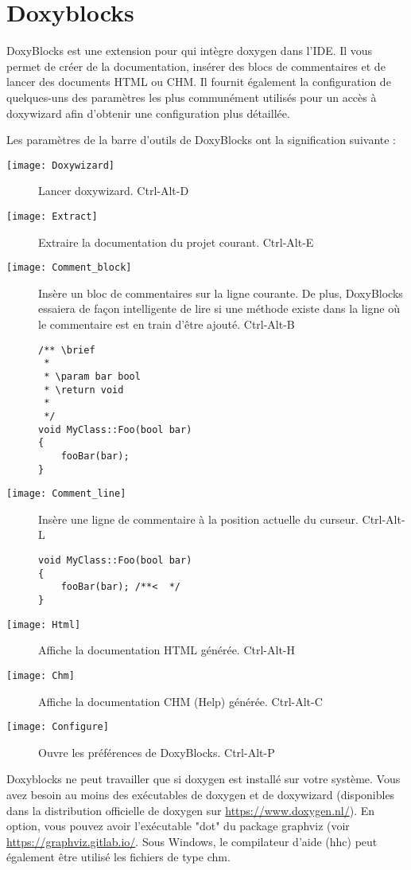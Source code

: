 ﻿\section{Doxyblocks}\label{sec:doxyblocks}

DoxyBlocks est une extension pour \codeblocks qui intègre doxygen dans l'IDE. Il vous permet de créer de la documentation, insérer des blocs de commentaires et de lancer des documents HTML ou CHM. Il fournit également la configuration de quelques-uns des paramètres les plus communément utilisés pour un accès à doxywizard afin d'obtenir une configuration plus détaillée.

Les paramètres de la barre d'outils de DoxyBlocks ont la signification suivante :

\begin{description}
\item[\texttt{[image: Doxywizard]}] Lancer doxywizard. Ctrl-Alt-D
\item[\texttt{[image: Extract]}] Extraire la documentation du projet courant. Ctrl-Alt-E
\item[\texttt{[image: Comment\_block]}] Insère un bloc de commentaires sur la ligne courante. De plus, DoxyBlocks essaiera de façon intelligente de lire si une méthode existe dans la ligne où le commentaire est en train d'être ajouté. Ctrl-Alt-B

\begin{lstlisting}
/** \brief
 *
 * \param bar bool
 * \return void
 *
 */    
void MyClass::Foo(bool bar)
{
    fooBar(bar);
}
\end{lstlisting}

\item[\texttt{[image: Comment\_line]}] Insère une ligne de commentaire à la position actuelle du curseur. Ctrl-Alt-L
\begin{lstlisting}
void MyClass::Foo(bool bar)
{
    fooBar(bar); /**<  */
}
\end{lstlisting}

\item[\texttt{[image: Html]}] Affiche la documentation HTML générée. Ctrl-Alt-H
\item[\texttt{[image: Chm]}] Affiche la documentation CHM (Help) générée. Ctrl-Alt-C
\item[\texttt{[image: Configure]}] Ouvre les préférences de DoxyBlocks. Ctrl-Alt-P
\end{description}

Doxyblocks ne peut travailler que si doxygen est installé sur votre système. Vous avez besoin au moins des exécutables de doxygen et de doxywizard (disponibles dans la distribution officielle de doxygen sur \url{https://www.doxygen.nl/}). En option, vous pouvez avoir l'exécutable "dot" du package graphviz (voir \url{https://graphviz.gitlab.io/}. Sous Windows, le compilateur d'aide (hhc) peut également être utilisé les fichiers de type chm.

